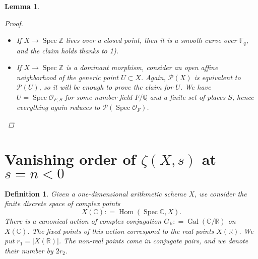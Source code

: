 \documentclass[draft]{article}
\DeclareMathOperator{\Gal}{Gal}
\DeclareMathOperator{\Hom}{Hom}
\DeclareMathOperator{\Spec}{Spec}
\newcommand{\CC}{\mathbb{C}}
\newcommand{\FF}{\mathbb{F}}
\newcommand{\QQ}{\mathbb{Q}}
\newcommand{\RR}{\mathbb{R}}
\newcommand{\ZZ}{\mathbb{Z}}
\newcommand{\dfn}{\mathrel{\mathop:}=}
\theoremstyle{myplain}
\newtheorem{lemma}[theorem]{Lemma}
\theoremstyle{mydefinition}
\newtheorem{definition}[theorem]{Definition}
\numberwithin{equation}{section}
\begin{document}
\begin{lemma}
\begin{proof}
    \begin{itemize}
    \item If $X \to \Spec \ZZ$ lives over a closed point, then it is a smooth
      curve over $\FF_q$, and the claim holds thanks to 1).

    \item If $X \to \Spec \ZZ$ is a dominant morphism, consider an open affine
      neighborhood of the generic point $U \subset X$. Again, $\mathcal{P} (X)$
      is equivalent to $\mathcal{P} (U)$, so it will be enough to prove the
      claim for $U$. We have $U = \Spec \mathcal{O}_{F,S}$ for some number field
      $F/\QQ$ and a finite set of places $S$, hence everything again reduces to
      $\mathcal{P} (\Spec \mathcal{O}_F)$. \qedhere
    \end{itemize}
  \end{proof}
\end{lemma}


\section{Vanishing order of $\zeta (X,s)$ at $s = n < 0$}
\label{sec:vanishing-order}

\begin{definition}
  Given a one-dimensional arithmetic scheme $X$, we consider the finite discrete
  space of complex points
  $$X(\CC) \dfn \Hom (\Spec \CC, X).$$
  There is a canonical action of complex conjugation $G_\RR \dfn \Gal (\CC/\RR)$
  on $X(\CC)$. The fixed points of this action correspond to the real points
  $X (\RR)$. We put $r_1 = |X (\RR)|$. The non-real points come in conjugate
  pairs, and we denote their number by $2 r_2$.
\end{definition}
\end{document}
